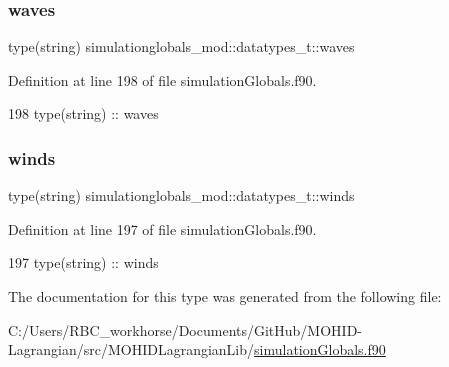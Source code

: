 \subsubsection{\texorpdfstring{waves}{waves}}
{\footnotesize\ttfamily type(string) simulationglobals\+\_\+mod\+::datatypes\+\_\+t\+::waves\hspace{0.3cm}{\ttfamily [private]}}



Definition at line 198 of file simulation\+Globals.\+f90.


\begin{DoxyCode}
198         \textcolor{keywordtype}{type}(string) :: waves
\end{DoxyCode}
\mbox{\label{structsimulationglobals__mod_1_1datatypes__t_ac8a4ee9292a74da9050bb8b244b43cc7}} 
\subsubsection{\texorpdfstring{winds}{winds}}
{\footnotesize\ttfamily type(string) simulationglobals\+\_\+mod\+::datatypes\+\_\+t\+::winds\hspace{0.3cm}{\ttfamily [private]}}



Definition at line 197 of file simulation\+Globals.\+f90.


\begin{DoxyCode}
197         \textcolor{keywordtype}{type}(string) :: winds
\end{DoxyCode}


The documentation for this type was generated from the following file\+:\begin{DoxyCompactItemize}
\item 
C\+:/\+Users/\+R\+B\+C\+\_\+workhorse/\+Documents/\+Git\+Hub/\+M\+O\+H\+I\+D-\/\+Lagrangian/src/\+M\+O\+H\+I\+D\+Lagrangian\+Lib/\mbox{\hyperlink{simulation_globals_8f90}{simulation\+Globals.\+f90}}\end{DoxyCompactItemize}
